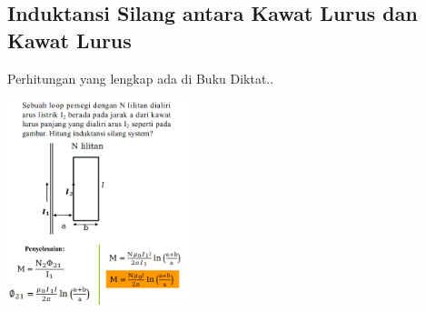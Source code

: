 \documentclass[twocolumn, 11pt]{article}%
\begin{document}
\subsection{Induktansi Silang antara Kawat Lurus dan Kawat Lurus}%
Perhitungan yang lengkap ada di Buku Diktat..

\begin{center}
    \includegraphics[width=200px]{16.png}
\end{center}
\end{document}
